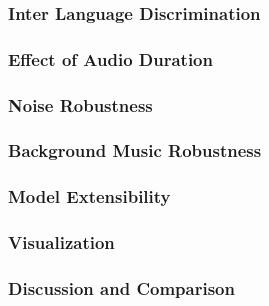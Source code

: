 \subsubsection{Inter Language Discrimination} 
\label{sec:lang_discrimination}
\subsubsection{Effect of Audio Duration} 
\label{sec:duration}
\subsubsection{Noise Robustness} 
\label{sec:noise_robustness}
\subsubsection{Background Music Robustness} 
\label{sec:music_robustness}
\subsubsection{Model Extensibility} 
\label{sec:extensibility}
\subsubsection{Visualization} 
\label{sec:visualization}

\subsubsection{Discussion and Comparison} 
\label{sec:comparison}
